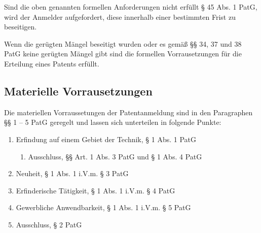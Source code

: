 Sind die oben genannten formellen Anforderungen nicht erfüllt § 45 Abs. 1 PatG, wird der Anmelder aufgefordert, diese innerhalb einer bestimmten Frist zu beseitigen.

Wenn die gerügten Mängel beseitigt wurden oder es gemäß §§ 34, 37 und 38 PatG keine gerügten Mängel gibt sind die formellen Vorrausetzungen für die Erteilung eines Patents erfüllt.

\subsection{Materielle Vorrausetzungen}

Die materiellen Vorraussetungen der Patentanmeldung sind in den Paragraphen §§ 1 – 5 PatG geregelt und lassen sich unterteilen in folgende Punkte:

\begin{enumerate}
    \item Erfindung auf einem Gebiet der Technik, § 1 Abs. 1 PatG
    \begin{enumerate}
    \vspace{-0.05in}
    \item Ausschluss, §§ Art. 1 Abs. 3 PatG und § 1 Abs. 4 PatG
    \end{enumerate}
    \vspace{-0.11in} 
    \item Neuheit, § 1 Abs. 1 i.V.m. § 3 PatG
    \vspace{-0.11in} 
    \item Erfinderische Tätigkeit, § 1 Abs. 1 i.V.m. § 4 PatG
    \vspace{-0.11in} 
    \item Gewerbliche Anwendbarkeit, § 1 Abs. 1 i.V.m. § 5 PatG
    \vspace{-0.11in} 
    \item Ausschluss, § 2 PatG
\end{enumerate}


